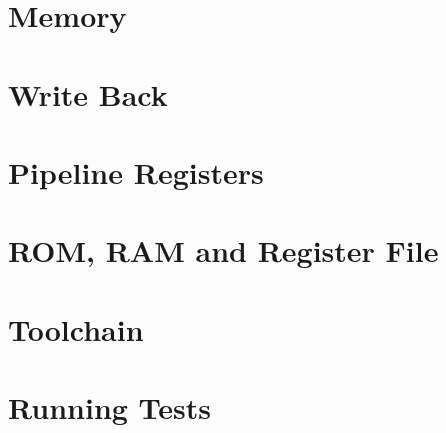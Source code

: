 \documentclass[12pt]{article}
\begin{document}
\section{Memory}



\section{Write Back}



\section{Pipeline Registers}


\section{ROM, RAM and Register File}




\section{Toolchain}


\section{Running Tests}



\printbibliography[heading=bibintoc]
\end{document}
